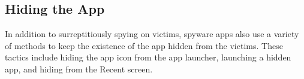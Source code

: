 



\subsection{Hiding the App}
\label{subsec:hiding_the_app}
In addition to surreptitiously spying on victims, spyware apps also use a
variety of methods to keep the existence of the app hidden from the victims.
These tactics include hiding the app icon from the app launcher, launching a
hidden app, and hiding from the Recent screen.

